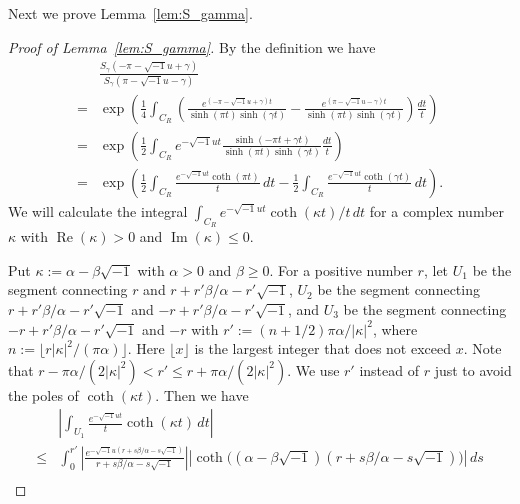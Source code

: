 \documentclass[a4paper]{amsart}
\theoremstyle{plain}
\theoremstyle{definition}
\theoremstyle{remark}
\renewcommand{\Re}{\operatorname{Re}}
\renewcommand{\Im}{\operatorname{Im}}
\numberwithin{equation}{section}
\begin{document}
Next we prove Lemma~\ref{lem:S_gamma}.
\begin{proof}[Proof of Lemma~\ref{lem:S_gamma}]
By the definition we have
\begin{equation*}
\begin{split}
  &\frac{S_{\gamma}(-\pi-\sqrt{-1}u+\gamma)}{S_{\gamma}(\pi-\sqrt{-1}u-\gamma)}
  \\
  =&
  \exp
  \left(
    \frac{1}{4}
    \int_{C_R}
    \left(
      \frac{e^{(-\pi-\sqrt{-1}u+\gamma)t}}{\sinh(\pi t)\sinh(\gamma t)}
      -
      \frac{e^{(\pi-\sqrt{-1}u-\gamma)t}}{\sinh(\pi t)\sinh(\gamma t)}
    \right)
    \frac{dt}{t}
  \right)
  \\
  =&
  \exp
  \left(
    \frac{1}{2}
    \int_{C_R}
    e^{-\sqrt{-1}ut}
    \frac{\sinh(-\pi t+\gamma t)}{\sinh(\pi t)\sinh(\gamma t)}
    \frac{dt}{t}
  \right)
  \\
  =&
  \exp
  \left(
    \frac{1}{2}
    \int_{C_R}
    \frac{e^{-\sqrt{-1}ut}\coth(\pi t)}{t}
    \,dt
    -
    \frac{1}{2}
    \int_{C_R}
    \frac{e^{-\sqrt{-1}ut}\coth(\gamma t)}{t}
    \,dt
  \right).
\end{split}
\end{equation*}
We will calculate the integral $\int_{C_R}e^{-\sqrt{-1}ut}\coth(\kappa t)/t\,dt$ for a complex number $\kappa$ with $\Re(\kappa)>0$ and $\Im(\kappa)\le0$.
\par
Put $\kappa:=\alpha-\beta\sqrt{-1}$ with $\alpha>0$ and $\beta\ge0$.
For a positive number $r$, let $U_1$ be the segment connecting $r$ and $r+r'\beta/\alpha-r'\sqrt{-1}$, $U_2$ be the segment connecting $r+r'\beta/\alpha-r'\sqrt{-1}$ and $-r+r'\beta/\alpha-r'\sqrt{-1}$, and $U_3$ be the segment connecting $-r+r'\beta/\alpha-r'\sqrt{-1}$ and $-r$ with $r':=(n+1/2)\pi\alpha/|\kappa|^2$, where $n:=\lfloor{r|\kappa|^2/(\pi\alpha)}\rfloor$.
Here $\lfloor{x}\rfloor$ is the largest integer that does not exceed $x$.
Note that $r-\pi\alpha/(2|\kappa|^2)<r'\le r+\pi\alpha/(2|\kappa|^2)$.
We use $r'$ instead of $r$ just to avoid the poles of $\coth(\kappa t)$.
Then we have
\begin{equation*}
\begin{split}
  &\left|
    \int_{U_1}
    \frac{e^{-\sqrt{-1}ut}}{t}
    \coth(\kappa t)
    \,dt
  \right|
  \\
  \le&
  \int_{0}^{r'}
  \left|
    \frac{e^{-\sqrt{-1}u(r+s\beta/\alpha-s\sqrt{-1})}}
         {r+s\beta/\alpha-s\sqrt{-1}}
  \right|
  \left|
    \coth\bigl((\alpha-\beta\sqrt{-1})(r+s\beta/\alpha-s\sqrt{-1})\bigr)
  \right|
  \,ds
  \\

\end{split}
\end{equation*}
\end{proof}
\end{document}
